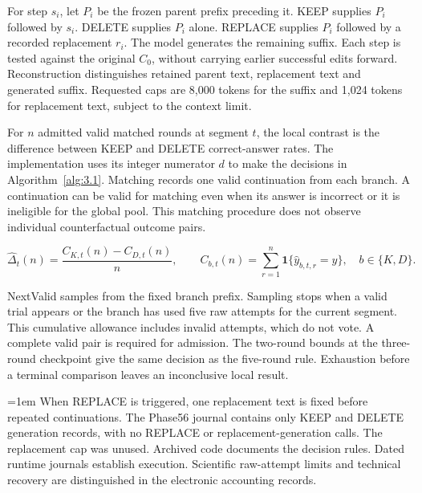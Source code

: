 For step $s_i$, let $P_i$ be the frozen parent prefix preceding it. KEEP supplies $P_i$ followed by $s_i$. DELETE supplies $P_i$ alone. REPLACE supplies $P_i$ followed by a recorded replacement $r_i$. The model generates the remaining suffix. Each step is tested against the original $C_0$, without carrying earlier successful edits forward. Reconstruction distinguishes retained parent text, replacement text and generated suffix. Requested caps are 8,000 tokens for the suffix and 1,024 tokens for replacement text, subject to the context limit.

For $n$ admitted valid matched rounds at segment $t$, the local contrast is the difference between KEEP and DELETE correct-answer rates. The implementation uses its integer numerator $d$ to make the decisions in Algorithm~\ref{alg:3.1}. Matching records one valid continuation from each branch. A continuation can be valid for matching even when its answer is incorrect or it is ineligible for the global pool. This matching procedure does not observe individual counterfactual outcome pairs.

\begin{equation}\label{eq:3.1}
\widehat{\Delta}_t(n)=\frac{C_{K,t}(n)-C_{D,t}(n)}{n},\qquad C_{b,t}(n)=\sum_{r=1}^{n}\mathbf{1}\{\widehat y_{b,t,r}=y\},\quad b\in\{K,D\}.
\end{equation}

NextValid samples from the fixed branch prefix. Sampling stops when a valid trial appears or the branch has used five raw attempts for the current segment. This cumulative allowance includes invalid attempts, which do not vote. A complete valid pair is required for admission. The two-round bounds at the three-round checkpoint give the same decision as the five-round rule. Exhaustion before a terminal comparison leaves an inconclusive local result.

\begingroup\emergencystretch=1em
When REPLACE is triggered, one replacement text is fixed before repeated continuations. The Phase56 journal contains only KEEP and DELETE generation records, with no REPLACE or re\-place\-ment-generation calls. The replacement cap was unused. Archived code documents the decision rules. Dated runtime journals establish execution. Scientific raw-attempt limits and technical recovery are distinguished in the electronic accounting records.\par
\endgroup

